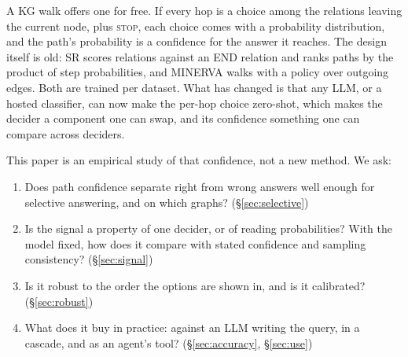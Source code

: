 \documentclass[11pt]{article}
\newcommand{\stopop}{\textsc{stop}}
\begin{document}
A KG walk offers one for free. If every hop is a choice among the relations leaving the
current node, plus \stopop{}, each choice comes with a probability distribution, and the
path's probability is a confidence for the answer it reaches. The design itself is old:
SR \citep{zhang2022sr} scores relations against an END relation and ranks paths by the
product of step probabilities, and MINERVA \citep{das2018minerva} walks with a policy
over outgoing edges. Both are trained per dataset. What has changed is that any LLM, or
a hosted classifier, can now make the per-hop choice zero-shot, which makes the decider
a component one can swap, and its confidence something one can compare across deciders.

This paper is an empirical study of that confidence, not a new method. We ask:
\begin{enumerate}
\setlength\itemsep{0pt}
\item Does path confidence separate right from wrong answers well enough for selective
  answering, and on which graphs? (\S\ref{sec:selective})
\item Is the signal a property of one decider, or of reading probabilities? With the
  model fixed, how does it compare with stated confidence and sampling consistency?
  (\S\ref{sec:signal})
\item Is it robust to the order the options are shown in, and is it calibrated?
  (\S\ref{sec:robust})
\item What does it buy in practice: against an LLM writing the query, in a cascade, and
  as an agent's tool? (\S\ref{sec:accuracy}, \S\ref{sec:use})
\end{enumerate}
\end{document}
